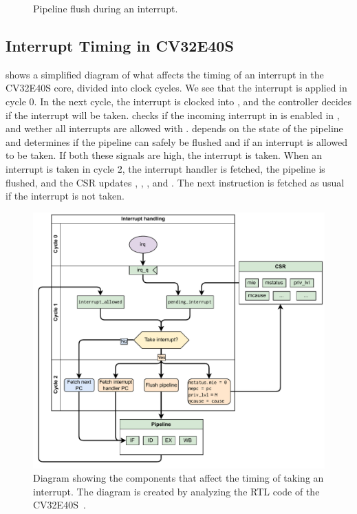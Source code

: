 \begin{figure}[htbp]
\centering

\caption{Pipeline flush during an interrupt.}
\label{fig:interrupt_flush}
\end{figure}



\subsection{Interrupt Timing in CV32E40S}

 shows a simplified diagram of what affects the timing of an interrupt in the CV32E40S core, divided into clock cycles. We see that the interrupt is applied in cycle 0. In the next cycle, the interrupt is clocked into , and the controller decides if the interrupt will be taken.  checks if the incoming interrupt in  is enabled in , and wether all interrupts are allowed with .  depends on the state of the pipeline and determines if the pipeline can safely be flushed and if an interrupt is allowed to be taken. 
If both these signals are high, the interrupt is taken. When an interrupt is taken in cycle 2, the interrupt handler is fetched, the pipeline is flushed, and the CSR updates , , , and . The next instruction is fetched as usual if the interrupt is not taken.


\begin{figure}
    \centering
    \includegraphics[width=1\linewidth]{figures/interrupt_handeling_timing.pdf}
    \caption{Diagram showing the components that affect the timing of taking an interrupt. The diagram is created by analyzing the RTL code of the CV32E40S~\cite{openhwgroupCv32e40s2024}.}
    \label{fig:interrupt_timing}
\end{figure}






